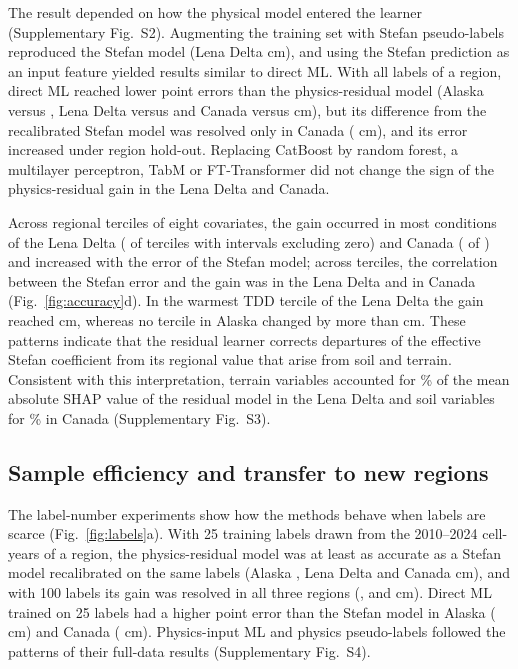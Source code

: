The result depended on how the physical model entered the learner (Supplementary Fig.~S2). Augmenting the training set with Stefan pseudo-labels reproduced the Stefan model (Lena Delta \ndrefLeblkDo{} cm), and using the Stefan prediction as an input feature yielded results similar to direct ML. With all labels of a region, direct ML reached lower point errors than the physics-residual model (Alaska \nrmseAkblkDz{} versus \nrmseAkblkRo, Lena Delta \nrmseLeblkDz{} versus \nrmseLeblkRo{} and Canada \nrmseCablkDz{} versus \nrmseCablkRo{} cm), but its difference from the recalibrated Stefan model was resolved only in Canada (\ndrefCablkDz{} cm), and its error increased under region hold-out. Replacing CatBoost by random forest, a multilayer perceptron, TabM or FT-Transformer did not change the sign of the physics-residual gain in the Lena Delta and Canada.

Across regional terciles of eight covariates, the gain occurred in most conditions of the Lena Delta (\ngcLesig{} of \ngcLecells{} terciles with intervals excluding zero) and Canada (\ngcCasig{} of \ngcCacells) and increased with the error of the Stefan model; across terciles, the correlation between the Stefan error and the gain was \ngcLecorr{} in the Lena Delta and \ngcCacorr{} in Canada (Fig.~\ref{fig:accuracy}d). In the warmest TDD tercile of the Lena Delta the gain reached \ndtddLewarm{} cm, whereas no tercile in Alaska changed by more than \ngcAkmaxabs{} cm. These patterns indicate that the residual learner corrects departures of the effective Stefan coefficient from its regional value that arise from soil and terrain. Consistent with this interpretation, terrain variables accounted for \nshapLeResTerrain\% of the mean absolute SHAP value of the residual model in the Lena Delta and soil variables for \nshapCaResSoil\% in Canada (Supplementary Fig.~S3).

\subsection{Sample efficiency and transfer to new regions}
The label-number experiments show how the methods behave when labels are scarce (Fig.~\ref{fig:labels}a). With 25 training labels drawn from the 2010--2024 cell-years of a region, the physics-residual model was at least as accurate as a Stefan model recalibrated on the same labels (Alaska \nllAkRotwfive, Lena Delta \nllLeRotwfive{} and Canada \nllCaRotwfive{} cm), and with 100 labels its gain was resolved in all three regions (\nllAkRohundred, \nllLeRohundred{} and \nllCaRohundred{} cm). Direct ML trained on 25 labels had a higher point error than the Stefan model in Alaska (\nllAkDztwfive{} cm) and Canada (\nllCaDztwfive{} cm). Physics-input ML and physics pseudo-labels followed the patterns of their full-data results (Supplementary Fig.~S4).

